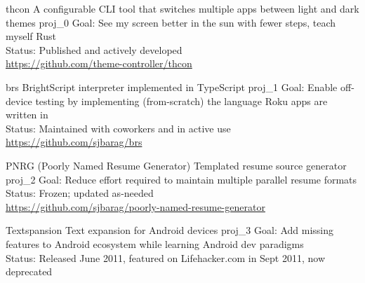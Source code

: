 \documentclass[10pt]{barag_resume}
\begin{document}
    \newpage %
\relax
    \begin{project}
        {thcon}
        {A configurable CLI tool that switches multiple apps between light and dark themes}
        {proj_0}
            Goal: See my screen better in the sun with fewer steps, teach myself Rust\\
            Status: Published and actively developed \\ 
            \url{https://github.com/theme-controller/thcon}
    \end{project}

    \begin{project}
        {brs}
        {BrightScript interpreter implemented in TypeScript}
        {proj_1}
            Goal: Enable off-device testing by implementing (from-scratch) the language Roku apps are written in\\
            Status: Maintained with coworkers and in active use \\ 
            \url{https://github.com/sjbarag/brs}
    \end{project}

    \begin{project}
        {PNRG (Poorly Named Resume Generator)}
        {Templated resume source generator}
        {proj_2}
            Goal: Reduce effort required to maintain multiple parallel resume formats\\
            Status: Frozen; updated as-needed \\ 
            \url{https://github.com/sjbarag/poorly-named-resume-generator}
    \end{project}

    \begin{project}
        {Textspansion}
        {Text expansion for Android devices}
        {proj_3}
            Goal: Add missing features to Android ecosystem while learning Android dev paradigms\\
            Status: Released June 2011, featured on Lifehacker.com in Sept 2011, now deprecated    \end{project}
\end{document}
